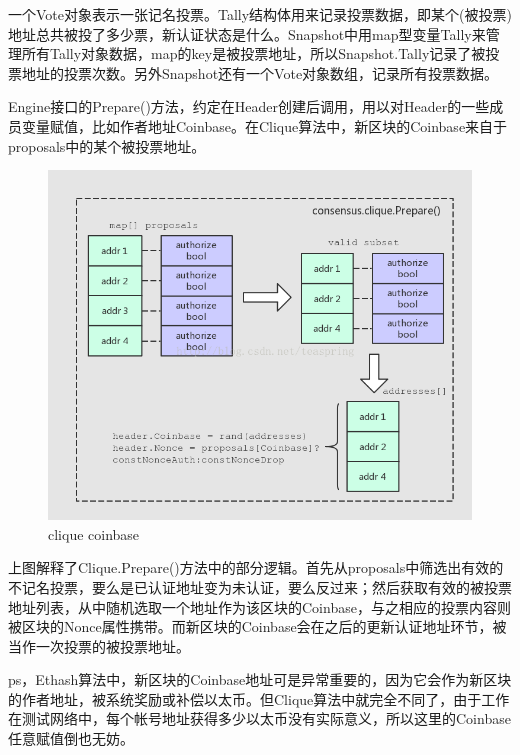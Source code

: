 \documentclass[UTF8]{ctexart}
\begin{document}
{一个Vote对象表示一张记名投票。Tally结构体用来记录投票数据，即某个(被投票)地址总共被投了多少票，新认证状态是什么。Snapshot中用map型变量Tally来管理所有Tally对象数据，map的key是被投票地址，所以Snapshot.Tally记录了被投票地址的投票次数。另外Snapshot还有一个Vote对象数组，记录所有投票数据。


Engine接口的Prepare()方法，约定在Header创建后调用，用以对Header的一些成员变量赋值，比如作者地址Coinbase。在Clique算法中，新区块的Coinbase来自于proposals中的某个被投票地址。

\begin{figure}
	\centering
	\includegraphics[scale=0.5]{clique_coinbase.png}
	\caption{clique coinbase}
	\label{cliqueCoinbase}
\end{figure}

上图解释了Clique.Prepare()方法中的部分逻辑。首先从proposals中筛选出有效的不记名投票，要么是已认证地址变为未认证，要么反过来；然后获取有效的被投票地址列表，从中随机选取一个地址作为该区块的Coinbase，与之相应的投票内容则被区块的Nonce属性携带。而新区块的Coinbase会在之后的更新认证地址环节，被当作一次投票的被投票地址。

ps，Ethash算法中，新区块的Coinbase地址可是异常重要的，因为它会作为新区块的作者地址，被系统奖励或补偿以太币。但Clique算法中就完全不同了，由于工作在测试网络中，每个帐号地址获得多少以太币没有实际意义，所以这里的Coinbase任意赋值倒也无妨。


}
\end{document}
